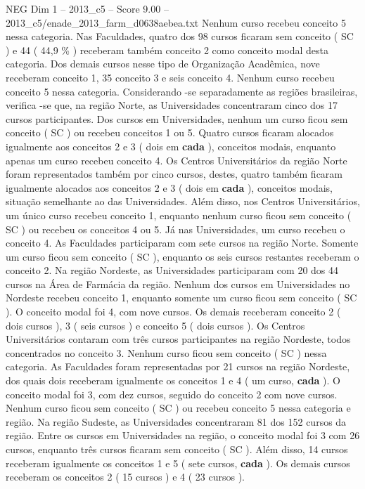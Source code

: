 \begin{textsample}{NEG Dim 1 – 2013\_c5 – Score 9.00 – 2013\_c5/enade\_2013\_farm\_d0638aebea.txt}
Nenhum curso recebeu conceito 5 nessa categoria.
Nas Faculdades, quatro dos 98 cursos ficaram sem conceito ( SC ) e 44 ( 44,9 \% ) receberam também conceito 2 como conceito modal desta categoria.
Dos demais cursos nesse tipo de Organização Acadêmica, nove receberam conceito 1, 35 conceito 3 e seis conceito 4.
Nenhum curso recebeu conceito 5 nessa categoria.
Considerando -se separadamente as regiões brasileiras, verifica -se que, na região Norte, as Universidades concentraram cinco dos 17 cursos participantes.
Dos cursos em Universidades, nenhum um curso ficou sem conceito ( SC ) ou recebeu conceitos 1 ou 5.
Quatro cursos ficaram alocados igualmente aos conceitos 2 e 3 ( dois em \textbf{cada} ), conceitos modais, enquanto apenas um curso recebeu conceito 4.
Os Centros Universitários da região Norte foram representados também por cinco cursos, destes, quatro também ficaram igualmente alocados aos conceitos 2 e 3 ( dois em \textbf{cada} ), conceitos modais, situação semelhante ao das Universidades.
Além disso, nos Centros Universitários, um único curso recebeu conceito 1, enquanto nenhum curso ficou sem conceito ( SC ) ou recebeu os conceitos 4 ou 5.
Já nas Universidades, um curso recebeu o conceito 4.
As Faculdades participaram com sete cursos na região Norte.
Somente um curso ficou sem conceito ( SC ), enquanto os seis cursos restantes receberam o conceito 2.
Na região Nordeste, as Universidades participaram com 20 dos 44 cursos na Área de Farmácia da região.
Nenhum dos cursos em Universidades no Nordeste recebeu conceito 1, enquanto somente um curso ficou sem conceito ( SC ).
O conceito modal foi 4, com nove cursos.
Os demais receberam conceito 2 ( dois cursos ), 3 ( seis cursos ) e conceito 5 ( dois cursos ).
Os Centros Universitários contaram com três cursos participantes na região Nordeste, todos concentrados no conceito 3.
Nenhum curso ficou sem conceito ( SC ) nessa categoria.
As Faculdades foram representadas por 21 cursos na região Nordeste, dos quais dois receberam igualmente os conceitos 1 e 4 ( um curso, \textbf{cada} ).
O conceito modal foi 3, com dez cursos, seguido do conceito 2 com nove cursos.
Nenhum curso ficou sem conceito ( SC ) ou recebeu conceito 5 nessa categoria e região.
Na região Sudeste, as Universidades concentraram 81 dos 152 cursos da região.
Entre os cursos em Universidades na região, o conceito modal foi 3 com 26 cursos, enquanto três cursos ficaram sem conceito ( SC ).
Além disso, 14 cursos receberam igualmente os conceitos 1 e 5 ( sete cursos, \textbf{cada} ).
Os demais cursos receberam os conceitos 2 ( 15 cursos ) e 4 ( 23 cursos ).

\end{textsample}
